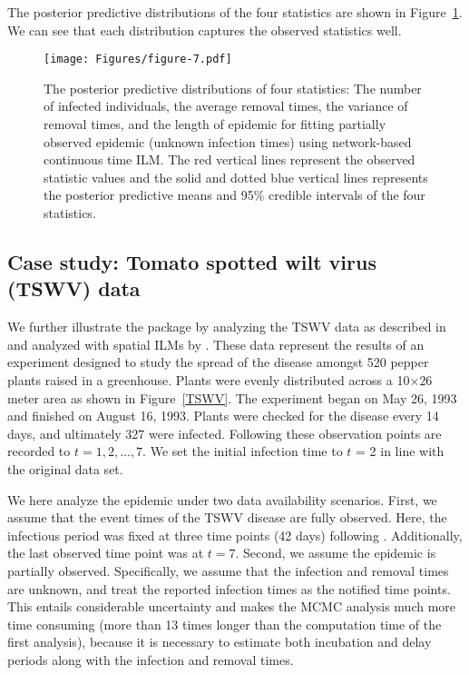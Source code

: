 \documentclass[nojss,shortnames]{jss}
\begin{document}
The posterior predictive distributions of the four statistics are shown in Figure~\ref{fig.prediction unknown infection}. We can see that each distribution captures the observed statistics well.

\begin{figure}[!t]
\begin{center}
\texttt{[image: Figures/figure-7.pdf]}
\caption{The posterior predictive distributions of four statistics: The number of infected individuals, the average removal times, the variance of removal times, and the length of epidemic for fitting partially observed epidemic (unknown infection times) using network-based continuous time ILM. The red vertical lines represent the observed statistic values and the solid and dotted blue vertical lines represents the posterior predictive means and 95\% credible intervals of the four statistics.}
\label{fig.prediction unknown infection}
\end{center}
\end{figure}

\subsection{Case study: Tomato spotted wilt virus (TSWV) data}

We further illustrate the  package by analyzing the TSWV data as described in \citet{hughes1997validating} and analyzed with spatial ILMs by \citet{pokharel2014supervised,pokharel2016gaussian}. 
These data represent the results of an experiment designed to study the spread of the disease amongst 520 pepper plants raised in a greenhouse. Plants were evenly distributed across a 10$\times$26 meter area as shown in Figure~\ref{TSWV}. The experiment began on May 26, 1993 and finished on August 16, 1993. Plants were checked for the disease every 14 days, and ultimately 327 were infected. Following \citet{pokharel2014supervised,pokharel2016gaussian} these observation points are recorded to $t = 1, 2, \dots, 7$. We set the initial infection time to $t$ = 2 in line with the original data set. 

We here analyze the epidemic under two data availability scenarios. First, we assume that the event times of the TSWV disease are fully observed. Here, the infectious period was fixed at three time points (42 days) following \citet{pokharel2014supervised,pokharel2016gaussian}. Additionally, the last observed time point was at $t = 7$. Second, we assume the epidemic is partially observed. Specifically, we assume that the infection and removal times are unknown, and treat the reported infection times as the notified time points. This entails considerable uncertainty and makes the MCMC analysis much more time consuming (more than 13 times longer than the computation time of the first analysis), because it is necessary to estimate both incubation and delay periods along with the infection and removal times. 
\end{document}

